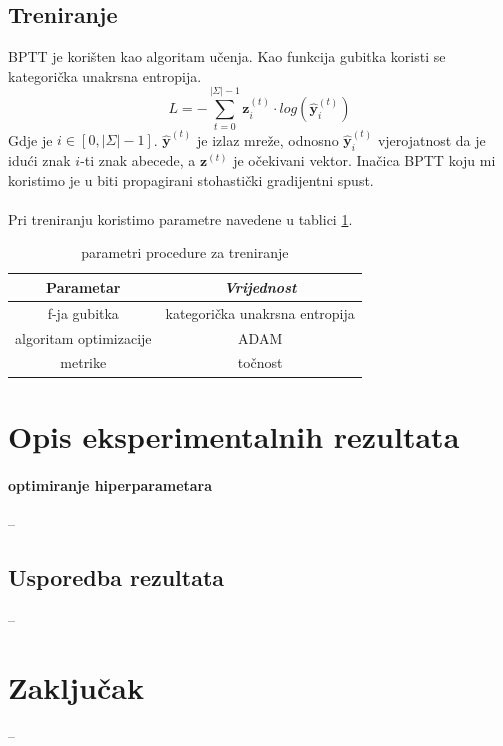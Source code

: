 \documentclass[conference]{IEEEtran}
\begin{document}
\subsection{Treniranje}
BPTT je korišten kao algoritam učenja.
Kao funkcija gubitka koristi se kategorička unakrsna entropija.
\begin{equation}
L = - \sum_{t = 0}^{\lvert \Sigma \rvert-1} \mathbf{z}_i^{(t)} \cdot log(\hat{\mathbf{y}}_i^{(t)})
\end{equation}
Gdje je $i \in [0, \lvert \Sigma \rvert - 1]$. $\hat{\mathbf{y}}^{(t)}$ je izlaz mreže, odnosno $\hat{\mathbf{y}}_i^{(t)}$ vjerojatnost da je idući znak $i$-ti znak abecede, a $\mathbf{z}^{(t)}$ je očekivani vektor.
Inačica BPTT koju mi koristimo je u biti propagirani stohastički gradijentni spust.\\
\\
Pri treniranju koristimo parametre navedene u tablici \ref{tab:trening}.
\begin{table}[htbp]
\caption{parametri procedure za treniranje}
\begin{center}
\begin{tabular}{|c|c|}
\hline
\textbf{Parametar} & \textbf{\textit{Vrijednost}}\\ \hline
f-ja gubitka & kategorička unakrsna entropija \\ \hline
algoritam optimizacije & ADAM \\ \hline
metrike & točnost \\ \hline
\end{tabular}
\label{tab:trening}
\end{center}
\end{table}

\section{Opis eksperimentalnih rezultata}

\paragraph{optimiranje hiperparametara}
--

\subsection{Usporedba rezultata}
--

\section{Zaključak}
--
\end{document}
